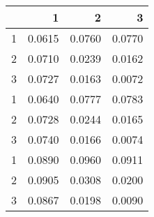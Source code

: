 \begin{tabular}{lrrr}
\toprule
{} &       1 &       2 &       3 \\
\midrule
1 &  0.0615 &  0.0760 &  0.0770 \\
2 &  0.0710 &  0.0239 &  0.0162 \\
3 &  0.0727 &  0.0163 &  0.0072 \\
1 &  0.0640 &  0.0777 &  0.0783 \\
2 &  0.0728 &  0.0244 &  0.0165 \\
3 &  0.0740 &  0.0166 &  0.0074 \\
1 &  0.0890 &  0.0960 &  0.0911 \\
2 &  0.0905 &  0.0308 &  0.0200 \\
3 &  0.0867 &  0.0198 &  0.0090 \\
\bottomrule
\end{tabular}
